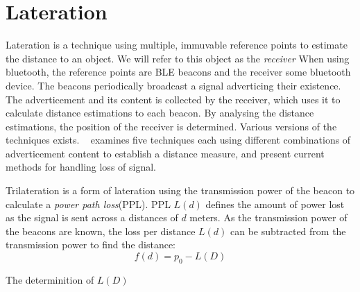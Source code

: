 \section{Lateration}
Lateration is a technique using multiple, immuvable reference points to estimate the distance to an object\cite{presence_ble_review}.
We will refer to this object as the \textit{receiver}   
When using bluetooth, the reference points are BLE beacons and the receiver some bluetooth device. 
The beacons periodically broadcast a signal adverticing their existence. 
The adverticement and its content is collected by the receiver, which uses it to calculate distance estimations to each beacon. 
By analysing the distance estimations, the position of the receiver is determined.
Various versions of the techniques exists.
\citeauthor{presence_ble_review}~\cite{presence_ble_review} examines five techniques each using different combinations of adverticement content to establish a distance measure, and present current methods for handling loss of signal.

Trilateration is a form of lateration using the transmission power of the beacon to calculate a \textit{power path loss}(PPL).
PPL $L(d)$ defines the amount of power lost as the signal is sent across a distances of $d$ meters.
As the transmission power of the beacons are known, the loss per distance $L(d)$ can be subtracted from the transmission power to find the distance:\cite{taking_localization_to_the_wild}
\begin{equation}
    f(d) = p_0 - L(D)
\end{equation}

The determinition of $L(D)$ 

